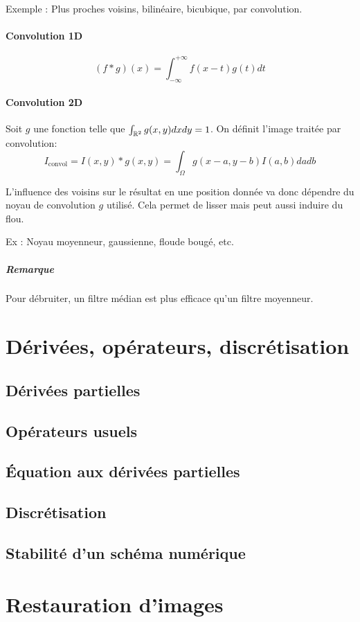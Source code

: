 \documentclass[french]{article}
\begin{document}
Exemple : Plus proches voisins, bilinéaire, bicubique, par convolution.

\paragraph{Convolution 1D}
$$(f * g)(x) = \int_{-\infty}^{+\infty}f(x-t) g(t) dt$$

\paragraph{Convolution 2D}
Soit $g$ une fonction telle que $\int_{\Bbb{R}^2}g(x,y)dxdy=1$.
On définit l'image traitée par convolution:
$$I_{\text{convol}} = I(x,y) * g(x, y) = \int_{\Omega}g(x - a, y -b) I(a,b) da db$$

L'influence des voisins sur le résultat en une position donnée va donc
dépendre du noyau de convolution $g$ utilisé. Cela permet de lisser mais
peut aussi induire du flou.

Ex : Noyau moyenneur, gaussienne, floude bougé, etc.

\subparagraph{Remarque} Pour débruiter, un filtre médian est plus
efficace qu'un filtre moyenneur.

\section{Dérivées, opérateurs, discrétisation}
\subsection{Dérivées partielles}
\subsection{Opérateurs usuels}
\subsection{Équation aux dérivées partielles}
\subsection{Discrétisation}
\subsection{Stabilité d'un schéma numérique}

\section{Restauration d'images}
\end{document}
